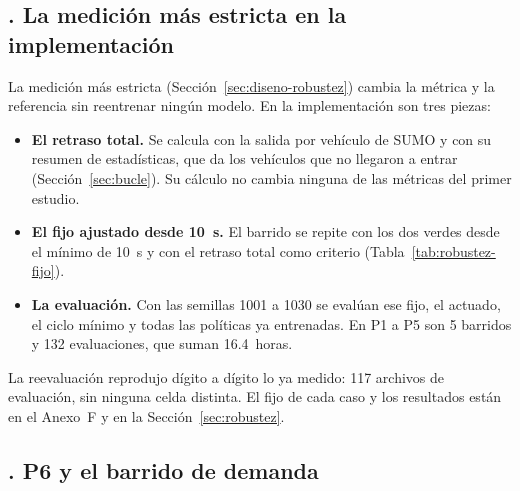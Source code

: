 \subsection*{\theanexoIapartado. La medición más estricta en la implementación}
\label{sec:remedicion}

La medición más estricta (Sección~\ref{sec:diseno-robustez}) cambia la
métrica y la referencia sin reentrenar ningún modelo. En la
implementación son tres piezas:

\begin{itemize}
  \item \textbf{El retraso total.} Se calcula con la salida por
    vehículo de SUMO y con su resumen de estadísticas, que da los
    vehículos que no llegaron a entrar (Sección~\ref{sec:bucle}). Su
    cálculo no cambia ninguna de las métricas del primer estudio.
  \item \textbf{El fijo ajustado desde 10~s.} El barrido se repite con
    los dos verdes desde el mínimo de 10~s y con el retraso total como
    criterio (Tabla~\ref{tab:robustez-fijo}).
  \item \textbf{La evaluación.} Con las semillas 1001 a 1030 se evalúan
    ese fijo, el actuado, el ciclo mínimo y todas las políticas ya
    entrenadas. En P1 a P5 son 5 barridos y 132 evaluaciones, que suman
    16.4~horas.
\end{itemize}

La reevaluación reprodujo dígito a dígito lo ya medido: 117 archivos de
evaluación, sin ninguna celda distinta. El fijo de cada caso y los
resultados están en el Anexo~F y en la Sección~\ref{sec:robustez}.

\subsection*{\theanexoIapartado. P6 y el barrido de demanda}
\label{sec:p6-demanda}

